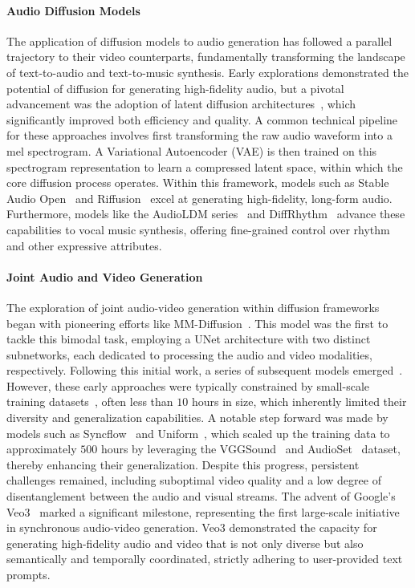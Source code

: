 \paragraph{Audio Diffusion Models} The application of diffusion models to audio generation has followed a parallel trajectory to their video counterparts, fundamentally transforming the landscape of text-to-audio and text-to-music synthesis. Early explorations demonstrated the potential of diffusion for generating high-fidelity audio, but a pivotal advancement was the adoption of latent diffusion architectures~\cite{rombach2022high}, which significantly improved both efficiency and quality. A common technical pipeline for these approaches involves first transforming the raw audio waveform into a mel spectrogram. A Variational Autoencoder (VAE) is then trained on this spectrogram representation to learn a compressed latent space, within which the core diffusion process operates. Within this framework, models such as Stable Audio Open~\cite{evans2025stable} and Riffusion~\cite{riffusion} excel at generating high-fidelity, long-form audio. Furthermore, models like the AudioLDM series~\cite{audioldm2-2024taslp,liu2023audioldm} and DiffRhythm~\cite{ning2025diffrhythm} advance these capabilities to vocal music synthesis, offering fine-grained control over rhythm and other expressive attributes.

\paragraph{Joint Audio and Video Generation} The exploration of joint audio-video generation within diffusion frameworks began with pioneering efforts like MM-Diffusion~\cite{ruan2023mm}. This model was the first to tackle this bimodal task, employing a UNet architecture with two distinct subnetworks, each dedicated to processing the audio and video modalities, respectively. Following this initial work, a series of subsequent models emerged~\cite{ishii2024simple,hayakawa2024mmdisco,ergasti2025r}. However, these early approaches were typically constrained by small-scale training datasets~\cite{lee2022sound,li2021ai}, often less than $10$ hours in size, which inherently limited their diversity and generalization capabilities. A notable step forward was made by models such as Syncflow~\cite{liu2024syncflow} and Uniform~\cite{zhao2025uniform}, which scaled up the training data to approximately $500$ hours by leveraging the VGGSound~\cite{chen2020vggsound} and AudioSet~\cite{gemmeke2017audio} dataset, thereby enhancing their generalization. Despite this progress, persistent challenges remained, including suboptimal video quality and a low degree of disentanglement between the audio and visual streams. The advent of Google's Veo3~\cite{veo32025} marked a significant milestone, representing the first large-scale initiative in synchronous audio-video generation. Veo3 demonstrated the capacity for generating high-fidelity audio and video that is not only diverse but also semantically and temporally coordinated, strictly adhering to user-provided text prompts.